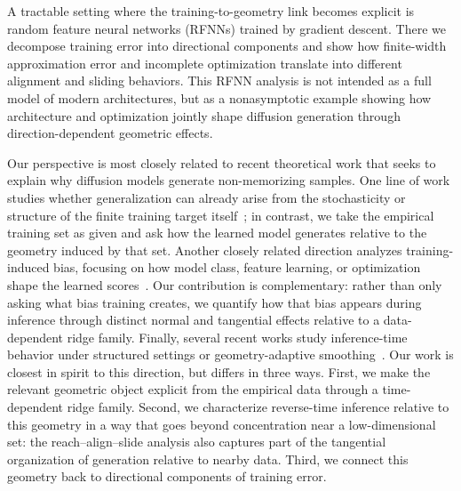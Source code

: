 \documentclass[11pt]{article}
\begin{document}
A tractable setting where the training-to-geometry link becomes explicit is random feature neural networks (RFNNs) trained by gradient descent. There we decompose training error into directional components and show how finite-width approximation error and incomplete optimization translate into different alignment and sliding behaviors. This RFNN analysis is not intended as a full model of modern architectures, but as a nonasymptotic example showing how architecture and optimization jointly shape diffusion generation through direction-dependent geometric effects.

Our perspective is most closely related to recent theoretical work that seeks to explain why diffusion models generate non-memorizing samples. One line of work studies whether generalization can already arise from the stochasticity or structure of the finite training target itself~\citep{vastola2025generalization,bertrand2025closed}; in contrast, we take the empirical training set as given and ask how the learned model generates relative to the geometry induced by that set. Another closely related direction analyzes training-induced bias, focusing on how model class, feature learning, or optimization shape the learned scores~\citep{kamb2024analytic,shah2025does,wu2025taking,bonnaire2025diffusion}. Our contribution is complementary: rather than only asking what bias training creates, we quantify how that bias appears during inference through distinct normal and tangential effects relative to a data-dependent ridge family. Finally, several recent works study inference-time behavior under structured settings or geometry-adaptive smoothing~\citep{baptista2025memorization,farghly2025diffusion,li2025scores}. Our work is closest in spirit to this direction, but differs in three ways. First, we make the relevant geometric object explicit from the empirical data through a time-dependent ridge family. Second, we characterize reverse-time inference relative to this geometry in a way that goes beyond concentration near a low-dimensional set: the reach–align–slide analysis also captures part of the tangential organization of generation relative to nearby data. Third, we connect this geometry back to directional components of training error.
\end{document}
